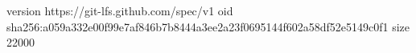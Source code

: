 version https://git-lfs.github.com/spec/v1
oid sha256:a059a332e00f99e7af846b7b8444a3ee2a23f0695144f602a58df52e5149c0f1
size 22000
